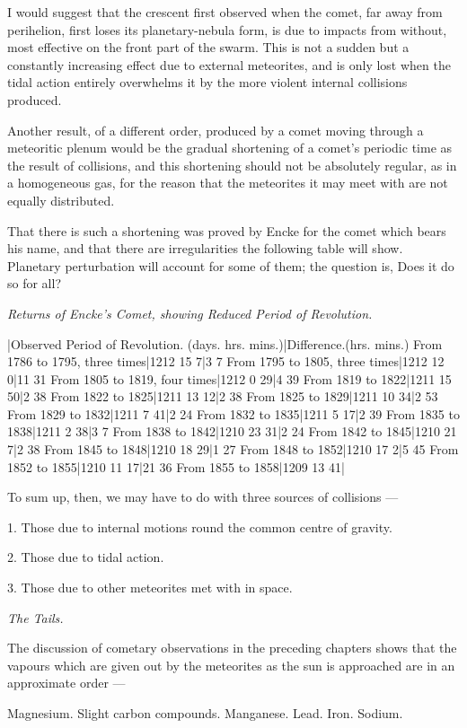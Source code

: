 \documentclass[a4paper, 12pt, oneside, polutonikogreek, english]{article}
\begin{document}
I would suggest that the crescent first observed when the comet, far away from perihelion, first loses its planetary-nebula form, is due to impacts from without, most effective on the front part of the swarm. This is not a sudden but a constantly increasing effect due to external meteorites, and is only lost when the tidal action entirely overwhelms it by the more violent internal collisions produced.

Another result, of a different order, produced by a comet moving through a meteoritic plenum would be the gradual shortening of a comet's periodic time as the result of collisions, and this shortening should not be absolutely regular, as in a homogeneous gas, for the reason that the meteorites it may meet with are not equally distributed.

That there is such a shortening was proved by Encke for the comet which bears his name, and that there are irregularities the following table will show. Planetary perturbation will account for some of them; the question is, Does it do so for all?

\emph{Returns of Encke's Comet, showing Reduced Period of Revolution.}

|Observed Period of Revolution. (days. hrs. mins.)|Difference.(hrs. mins.) 
From 1786 to 1795, three times|1212 15 7|3 7 
From 1795 to 1805, three times|1212 12 0|11 31 
From 1805 to 1819, four times|1212 0 29|4 39 
From 1819 to 1822|1211 15 50|2 38 
From 1822 to 1825|1211 13 12|2 38 
From 1825 to 1829|1211 10 34|2 53 
From 1829 to 1832|1211 7 41|2 24 
From 1832 to 1835|1211 5 17|2 39 
From 1835 to 1838|1211 2 38|3 7 
From 1838 to 1842|1210 23 31|2 24 
From 1842 to 1845|1210 21 7|2 38 
From 1845 to 1848|1210 18 29|1 27 
From 1848 to 1852|1210 17 2|5 45 
From 1852 to 1855|1210 11 17|21 36 
From 1855 to 1858|1209 13 41|

To sum up, then, we may have to do with three sources of collisions ---

1. Those due to internal motions round the common centre of gravity.

2. Those due to tidal action.

3. Those due to other meteorites met with in space.

\emph{The Tails.}

The discussion of cometary observations in the preceding chapters shows that the vapours which are given out by the meteorites as the sun is approached are in an approximate order ---

Magnesium. 
Slight carbon compounds. 
Manganese. 
Lead. 
Iron. 
Sodium. 
\end{document}
